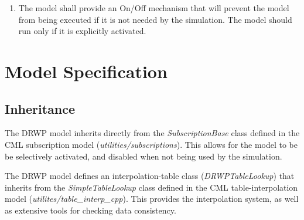 \documentclass[11pt,fleqn]{report}
\begin{document}
\begin{enumerate}
variables:
  \begin{enumerate}
  \item the 2 or 3 components of the Cartesian wind velocity as provided in
    the data file; these are expressed in the Topocentric ENU frame.
  \item A 3-component Cartesian vector representing the wind velocity
    expressed in the Topocentric NED frame.
  \item The azimuth angle representing the direction from which the wind is
    blowing in the horizontal plane.
  \item The azimuth angle representing the direction to which the wind is
    blowing in the horizontal plane.
  \item The magnitude of the wind velocity vector.
  \item The atmospheric mass-density
  \item The atmospheric kinetic-temperature
  \item The atmospheric static-pressure.
  \item The local speed of sound.
  \end{enumerate}
\item The model shall provide an On/Off mechanism that will prevent the model
  from being executed if it is not needed by the simulation.
  The model should run only if it is explicitly activated.
\end{enumerate}



\newpage
\chapter{Model Specification}
\section{Inheritance}\label{sec:Inheritance}

The DRWP model inherits directly from the \textit{SubscriptionBase} class
defined in the CML
subscription model (\textit{utilities/subscriptions}).
This allows for the model to be be selectively activated, and disabled when
not being used by the simulation.

The DRWP model defines an interpolation-table class
(\textit{DRWPTableLookup}) that inherits from the
\textit{SimpleTableLookup} class defined in the CML table-interpolation
model (\textit{utilites/table\_interp\_cpp}). This provides the
interpolation system, as well as extensive tools for checking data
consistency.
\end{document}
